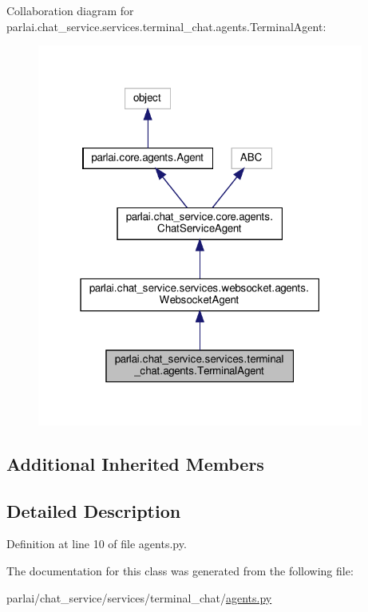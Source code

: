 Collaboration diagram for parlai.\+chat\+\_\+service.\+services.\+terminal\+\_\+chat.\+agents.\+Terminal\+Agent\+:
\nopagebreak
\begin{figure}[H]
\begin{center}
\leavevmode
\includegraphics[width=304pt]{d0/deb/classparlai_1_1chat__service_1_1services_1_1terminal__chat_1_1agents_1_1TerminalAgent__coll__graph}
\end{center}
\end{figure}
\subsection*{Additional Inherited Members}


\subsection{Detailed Description}


Definition at line 10 of file agents.\+py.



The documentation for this class was generated from the following file\+:\begin{DoxyCompactItemize}
\item 
parlai/chat\+\_\+service/services/terminal\+\_\+chat/\hyperlink{parlai_2chat__service_2services_2terminal__chat_2agents_8py}{agents.\+py}\end{DoxyCompactItemize}
